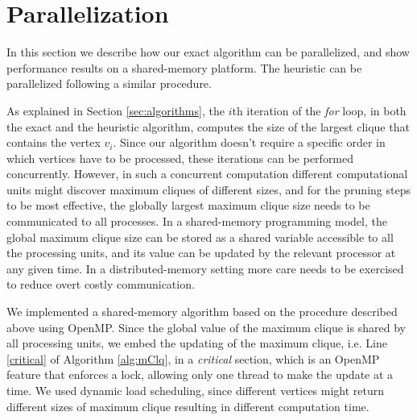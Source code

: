 \section{Parallelization}
\label{sec:parallelization}


In this section we describe how our exact algorithm can be parallelized, and show performance results
on a shared-memory platform. The heuristic can be parallelized following a similar procedure.

As explained in Section \ref{sec:algorithms}, the $i$th iteration of the {\em for} loop, in both the exact and the heuristic algorithm, computes the size of the largest clique that contains the vertex $v_i$. Since our algorithm doesn't require a specific order in which vertices have to be processed, these iterations can be
performed concurrently. 
However, in such a concurrent computation different computational units might discover maximum cliques of different sizes, and for the pruning steps to be most effective, the globally largest maximum clique size needs to be communicated to all processes. In a shared-memory programming model, the global maximum clique size can be stored as a shared variable accessible to all the processing units, and its value can be updated by the relevant processor at any given time. In a distributed-memory setting more care needs to be exercised to reduce overt costly communication. 

We implemented a shared-memory algorithm based on the procedure described above using OpenMP. Since the global value of the maximum clique is shared by all processing units, we embed the updating of the maximum clique, i.e. Line \ref{critical} of Algorithm \ref{alg:mClq}, in a {\it critical} section, which is an OpenMP feature that enforces a lock, allowing only one thread to make the update at a time. We used  dynamic load scheduling, since different vertices might return different sizes of maximum clique resulting in different
computation time.

